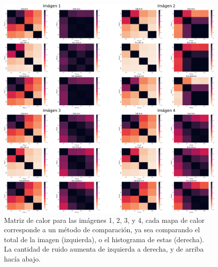 \begin{figure}
    \centering
    \includegraphics[width=\textwidth]{figuras/heatmaps/heatmaps_app_0.png}
    \caption{Matriz de calor para las im\'agenes 1, 2, 3, y 4, cada mapa de calor corresponde a un m\'etodo de comparaci\'on, ya sea comparando el total de la imagen (izquierda), o el histograma de estas (derecha). La cantidad de ruido aumenta de izquierda a derecha, y de arriba hacía abajo.}
\end{figure}

